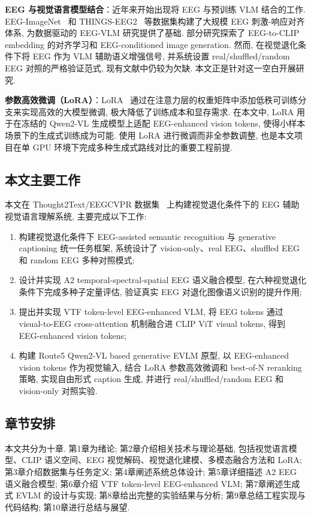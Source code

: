 \textbf{EEG 与视觉语言模型结合}：近年来开始出现将 EEG 与预训练 VLM 结合的工作. EEG-ImageNet~\cite{palazzo2017decoding} 和 THINGS-EEG2~\cite{hebron2024things} 等数据集构建了大规模 EEG 刺激-响应对齐体系, 为数据驱动的 EEG-VLM 研究提供了基础. 部分研究探索了 EEG-to-CLIP embedding 的对齐学习和 EEG-conditioned image generation. 然而, 在视觉退化条件下将 EEG 作为 VLM 辅助语义增强信号, 并系统设置 real/shuffled/random EEG 对照的严格验证范式, 现有文献中仍较为欠缺. 本文正是针对这一空白开展研究.

\textbf{参数高效微调（LoRA）}：LoRA~\cite{hu2022lora} 通过在注意力层的权重矩阵中添加低秩可训练分支来实现高效的大模型微调, 极大降低了训练成本和显存需求. 在本文中, LoRA 用于在冻结的 Qwen2-VL 生成模型上适配 EEG-enhanced vision tokens, 使得小样本场景下的生成式训练成为可能. 使用 LoRA 进行微调而非全参数调整, 也是本文项目在单 GPU 环境下完成多种生成式路线对比的重要工程前提.

\subsection{本文主要工作}

本文在 Thought2Text/EEGCVPR 数据集~\cite{tirupattur2018thoughtviz} 上构建视觉退化条件下的 EEG 辅助视觉语言理解系统, 主要完成以下工作:

\begin{enumerate}
  \item 构建视觉退化条件下 EEG-assisted semantic recognition 与 generative captioning 统一任务框架, 系统设计了 vision-only、real EEG、shuffled EEG 和 random EEG 多种对照模式;
  \item 设计并实现 A2 temporal-spectral-spatial EEG 语义融合模型, 在六种视觉退化条件下完成多种子定量评估, 验证真实 EEG 对退化图像语义识别的提升作用;
  \item 提出并实现 VTF token-level EEG-enhanced VLM, 将 EEG tokens 通过 visual-to-EEG cross-attention 机制融合进 CLIP ViT visual tokens, 得到 EEG-enhanced vision tokens;
  \item 构建 Route5 Qwen2-VL based generative EVLM 原型, 以 EEG-enhanced vision tokens 作为视觉输入, 结合 LoRA 参数高效微调和 best-of-N reranking 策略, 实现自由形式 caption 生成, 并进行 real/shuffled/random EEG 和 vision-only 对照实验.
\end{enumerate}

\subsection{章节安排}

本文共分为十章. 第1章为绪论; 第2章介绍相关技术与理论基础, 包括视觉语言模型、CLIP 语义空间、EEG 视觉解码、视觉退化建模、多模态融合方法和 LoRA; 第3章介绍数据集与任务定义; 第4章阐述系统总体设计; 第5章详细描述 A2 EEG 语义融合模型; 第6章介绍 VTF token-level EEG-enhanced VLM; 第7章阐述生成式 EVLM 的设计与实现; 第8章给出完整的实验结果与分析; 第9章总结工程实现与代码结构; 第10章进行总结与展望.
